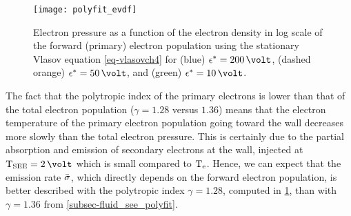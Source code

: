 \begin{figure}[hbt]
  \centering
  \texttt{[image: polyfit\_evdf]}
  \caption{Electron pressure as a function of the electron density in log scale of the forward (primary) electron population using the stationary Vlasov equation \cref{eq-vlasovch4} for (blue) $\crover=200\,\volt$, (dashed orange) $\crover=50\,\volt$, and (green) $\crover=10\,\volt$.}
  \label{fig-evdf_polyfit}
\end{figure}

The fact that the polytropic index of the primary electrons is lower than that of the total electron population ($\gamma=1.28$ versus $1.36$) means that the electron temperature of the primary electron population going toward the wall decreases more slowly than the total electron pressure.
This is certainly due to the partial absorption and emission of secondary electrons at the wall, injected at $\Tsee=2\,\volt$ which is small compared to $\mathrm{T_e}$.
Hence, we can expect that the emission rate $ \bar{\sigma }$, which directly depends on the forward electron population, is better described with the polytropic index $\gamma=1.28$, computed in \cref{fig-evdf_polyfit}, than with $\gamma=1.36$ from \cref{subsec-fluid_see_polyfit}.

